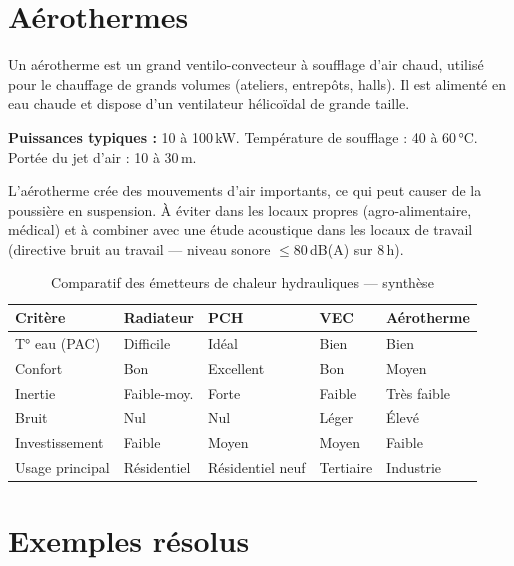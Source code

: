\section{Aérothermes}

\begin{definition}[title=Aérotherme]
Un aérotherme est un grand ventilo-convecteur à soufflage d'air chaud, utilisé pour le chauffage de grands volumes (ateliers, entrepôts, halls). Il est alimenté en eau chaude et dispose d'un ventilateur hélicoïdal de grande taille.
\end{definition}

\textbf{Puissances typiques :} 10 à 100\,kW. Température de soufflage : 40 à 60\,°C. Portée du jet d'air : 10 à 30\,m.

\begin{attention}
L'aérotherme crée des mouvements d'air importants, ce qui peut causer de la poussière en suspension. À éviter dans les locaux propres (agro-alimentaire, médical) et à combiner avec une étude acoustique dans les locaux de travail (directive bruit au travail — niveau sonore $\leq 80$\,dB(A) sur 8\,h).
\end{attention}

\begin{table}[H]
  \centering
  \caption{Comparatif des émetteurs de chaleur hydrauliques — synthèse}
  \begin{tabular}{p{2.5cm}p{2.5cm}p{2.5cm}p{2.5cm}p{2.5cm}}
    \toprule
    Critère & Radiateur & PCH & VEC & Aérotherme \\
    \midrule
    T° eau (PAC) & Difficile & Idéal & Bien & Bien \\
    Confort & Bon & Excellent & Bon & Moyen \\
    Inertie & Faible-moy. & Forte & Faible & Très faible \\
    Bruit & Nul & Nul & Léger & Élevé \\
    Investissement & Faible & Moyen & Moyen & Faible \\
    Usage principal & Résidentiel & Résidentiel neuf & Tertiaire & Industrie \\
    \bottomrule
  \end{tabular}
\end{table}

\section{Exemples résolus}

